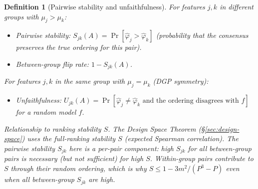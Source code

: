 \documentclass{article}
\newtheorem{definition}[theorem]{Definition}
\begin{document}
\begin{definition}[Pairwise stability and unfaithfulness]
For features $j, k$ in different groups with $\mu_j > \mu_k$:
\begin{itemize}
    \item \emph{Pairwise stability}: $S_{jk}(A) = \Pr[\hat\varphi_j > \hat\varphi_k]$ (probability that the consensus preserves the true ordering for this pair).
    \item \emph{Between-group flip rate}: $1 - S_{jk}(A)$.
\end{itemize}
For features $j, k$ in the same group with $\mu_j = \mu_k$ (DGP symmetry):
\begin{itemize}
    \item \emph{Unfaithfulness}: $U_{jk}(A) = \Pr[\hat\varphi_j \neq \hat\varphi_k \text{ and the ordering disagrees with } f]$ for a random model $f$.
\end{itemize}

\emph{Relationship to ranking stability $S$.} The Design Space Theorem (\S\ref{sec:design-space}) uses the full-ranking stability $S$ (expected Spearman correlation). The pairwise stability $S_{jk}$ here is a per-pair component: high $S_{jk}$ for all between-group pairs is necessary (but not sufficient) for high $S$. Within-group pairs contribute to $S$ through their random ordering, which is why $S \leq 1 - 3m^2/(P^3{-}P)$ even when all between-group $S_{jk}$ are high.
\end{definition}
\end{document}

